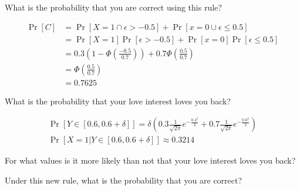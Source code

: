 \documentclass[11pt]{article}
\begin{document}
\newpage
{}

\begin{Parts}
    
    \Part What is the probability that you are correct using this rule? 
    
    \begin{Answer}
        \begin{align*}
            \Pr[C]  &= \Pr[X = 1 \cap \epsilon > -0.5] + \Pr[x = 0 \cup \epsilon \leq 0.5] \\
                    &= \Pr[X = 1] \Pr[\epsilon > -0.5] + \Pr[x = 0] \Pr[\epsilon \leq 0.5] \\
                    &= 0.3 (1 - \Phi(\frac{-0.5}{0.7})) + 0.7 \Phi(\frac{0.5}{0.7}) \\
                    &= \Phi(\frac{0.5}{0.7}) \\
                    &= 0.7625
        \end{align*}
    \end{Answer}

    \Part What is the probability that your love interest loves you back?

    \begin{Answer}
        \begin{align*}
            \Pr[Y\in[0.6,0.6+\delta]] = \delta (0.3 \frac{1}{\sqrt{2\pi}} e^{-\frac{0.4^2}{2}} + 0.7 \frac{1}{\sqrt{2\pi}} e^{-\frac{0.6^2}{2}}) \\
            \Pr[X=1|Y\in[0.6,0.6+\delta]] \approx 0.3214
        \end{align*}
    \end{Answer}

    \Part For what values is it more likely than not that your love interest loves you back? 

    \begin{Answer}
        
    \end{Answer}

    \Part Under this new rule, what is the probability that you are correct?
    
    \begin{Answer}
        
    \end{Answer}

\end{Parts}
\end{document}
